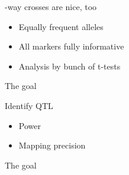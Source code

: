\documentclass[12pt]{article}
\newcommand{\headsize}{\fontsize{35}{35} \selectfont}
\newcommand{\smallsize}{\fontsize{25}{30} \selectfont}
\begin{document}
{\begin{minipage}{10in}
\begin{itemize}
\end{itemize}
\end{minipage}

\newpage


\headsize \color{myyellow}
\hfill \begin{minipage}{6.25in}
-way crosses are nice, too
\end{minipage}

\vspace{25mm}

\color{mywhite}
\smallsize

\hfill \begin{minipage}{10in}
\begin{itemize}
\itemsep24pt
\item Equally frequent alleles
\item All markers fully informative
\item Analysis by bunch of t-tests
\end{itemize}
\end{minipage}


\newpage


\headsize \color{myyellow}
\hfill \begin{minipage}{6.25in}
\centering
The goal
\end{minipage}

\vspace{25mm}

\color{mywhite}
\smallsize

\hfill \begin{minipage}{9.5in}
Identify QTL
\end{minipage}

\vspace{15mm}

\hfill \begin{minipage}{9in}
\color{myblue}
\begin{itemize}
\itemsep24pt
\item Power
\item Mapping precision
\end{itemize}
\end{minipage}

\newpage

\addtocounter{page}{-1}

\headsize \color{myyellow}
\hfill \begin{minipage}{6.25in}
\centering
The goal
\end{minipage}

}
\end{document}
